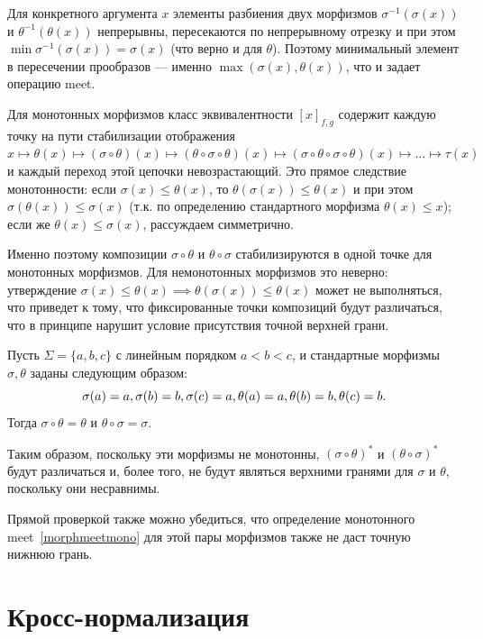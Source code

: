 \documentclass[fontsize=14pt]{scrartcl}
\begin{document}
Для конкретного аргумента $x$ элементы разбиения двух морфизмов $\sigma^{-1}(\sigma(x))$ и $\theta^{-1}(\theta(x))$ непрерывны,
пересекаются по непрерывному отрезку и при этом $\min \sigma^{-1}(\sigma(x)) = \sigma(x)$ (что верно и для $\theta$). Поэтому минимальный элемент в пересечении прообразов ---
именно $\max (\sigma(x), \theta(x))$, что и задает операцию meet.

Для монотонных морфизмов класс эквивалентности $[x]_{f,g}$ содержит каждую точку на пути стабилизации отображения 
$x \mapsto  \theta (x) \mapsto (\sigma \circ \theta) (x) \mapsto (\theta \circ \sigma \circ \theta) (x) \mapsto (\sigma \circ \theta \circ \sigma \circ \theta) (x) \mapsto \hdots \mapsto \tau(x)$
и каждый переход этой цепочки невозрастающий. Это прямое следствие монотонности: если $\sigma(x) \leq \theta(x)$, то $\theta(\sigma(x)) \leq \theta(x)$ и 
при этом $\sigma(\theta(x)) \leq \sigma(x)$ (т.к. по определению стандартного морфизма $\theta(x) \leq x$); если же $\theta(x) \leq \sigma(x)$, рассуждаем симметрично. 

Именно поэтому композиции $\sigma \circ \theta$ и $\theta \circ \sigma$ стабилизируются в одной точке для монотонных морфизмов. Для немонотонных морфизмов
это неверно: утверждение $\sigma(x) \leq \theta(x) \implies \theta(\sigma(x)) \leq \theta(x)$ может не выполняться, что приведет к тому, 
что фиксированные точки композиций будут различаться, что в принципе нарушит условие присутствия точной верхней грани.

\begin{Example}
Пусть $\Sigma = \{a, b, c\}$ с линейным порядком $a < b < c$, и стандартные морфизмы $\sigma, \theta$ заданы следующим образом:
$$
\sigma(a) = a, \sigma(b) = b, \sigma(c) = a, \\
\theta(a) = a, \theta(b) = b, \theta(c) = b.
$$
Тогда $\sigma \circ \theta = \theta$ и $\theta \circ \sigma = \sigma$. 

Таким образом, поскольку эти морфизмы не монотонны, $(\sigma \circ \theta)^*$ и $(\theta \circ \sigma)^*$ будут различаться и, более того,
не будут являться верхними гранями для $\sigma$ и $\theta$, поскольку они несравнимы.

Прямой проверкой также можно убедиться, что определение монотонного meet~\ref{morphmeetmono} для этой пары морфизмов также не даст точную нижнюю грань.

\end{Example}


\section{Кросс-нормализация}
\label{sec:cross-normalization}
\end{document}
